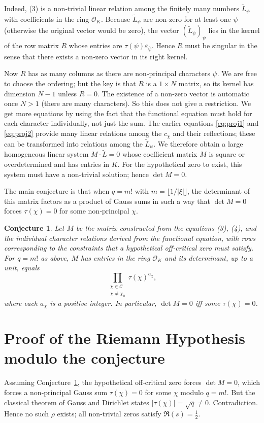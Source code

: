 \documentclass[12pt,a4paper]{article}
\newtheorem{conjecture}[theorem]{Conjecture}
\theoremstyle{definition}
\begin{document}
Indeed, (3) is a non‑trivial linear relation among the finitely many numbers \(\widetilde{L}_\psi\) with coefficients in the ring \(\mathcal{O}_K\).  Because \(\widetilde{L}_\psi\) are non‑zero for at least one \(\psi\) (otherwise the original vector would be zero), the vector \((\widetilde{L}_\psi)_\psi\) lies in the kernel of the row matrix \(R\) whose entries are \(\tau(\psi)\varepsilon_{\overline{\psi}}\).  Hence \(R\) must be singular in the sense that there exists a non‑zero vector in its right kernel.

Now \(R\) has as many columns as there are non‑principal characters \(\psi\).  We are free to choose the ordering; but the key is that \(R\) is a \(1\times N\) matrix, so its kernel has dimension \(N-1\) unless \(R=0\).  The existence of a non‑zero vector is automatic once \(N>1\) (there are many characters).  So this does not give a restriction.  We get more equations by using the fact that the functional equation must hold for each character individually, not just the sum.  The earlier equations \eqref{eq:proj1} and \eqref{eq:proj2} provide many linear relations among the \(c_\chi\) and their reflections; these can be transformed into relations among the \(\widetilde{L}_\psi\).  We therefore obtain a large homogeneous linear system \(M\cdot \widetilde{L}=0\) whose coefficient matrix \(M\) is square or overdetermined and has entries in \(K\).  For the hypothetical zero to exist, this system must have a non‑trivial solution; hence \(\det M = 0\).

The main conjecture is that when \(q=m!\) with \(m=\lfloor1/|\xi|\rfloor\), the determinant of this matrix factors as a product of Gauss sums in such a way that \(\det M=0\) forces \(\tau(\chi)=0\) for some non‑principal \(\chi\).

\begin{conjecture}\label{conj:main}
Let \(M\) be the matrix constructed from the equations (3), (4), and the individual character relations derived from the functional equation, with rows corresponding to the constraints that a hypothetical off‑critical zero must satisfy.  For \(q=m!\) as above, \(M\) has entries in the ring \(\mathcal{O}_K\) and its determinant, up to a unit, equals
\[
\prod_{\substack{\chi\in\mathcal{C}\\ \chi\neq\chi_0}} \tau(\chi)^{a_\chi},
\]
where each \(a_\chi\) is a positive integer.  In particular, \(\det M=0\) iff some \(\tau(\chi)=0\).
\end{conjecture}

\section{Proof of the Riemann Hypothesis modulo the conjecture}
Assuming Conjecture~\ref{conj:main}, the hypothetical off‑critical zero forces \(\det M=0\), which forces a non‑principal Gauss sum \(\tau(\chi)=0\) for some \(\chi\) modulo \(q=m!\).  But the classical theorem of Gauss and Dirichlet states \(|\tau(\chi)|=\sqrt{q}\neq0\).  Contradiction.  Hence no such \(\rho\) exists; all non‑trivial zeros satisfy \(\Re(s)=\frac12\).
\end{document}
